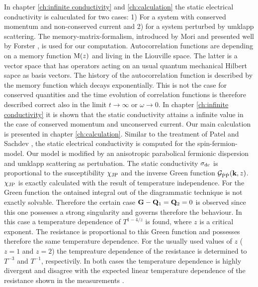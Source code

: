 In chapter \ref{ch:infinite conductivity} and \ref{ch:calculation} the static electrical conductivity is caluculated for two cases:
1) For a system with conserved momentum and non-conserved current and
2) for a system perturbed by umklapp scattering.
The memory-matrix-formalism, introduced by Mori \cite{Mori} and presented well by Forster \cite{Forster}, is used for our computation.
Autocorrelation functions are depending on a memory function $\mathrm{M}(z)$ and living in the Liouville space.
The latter is a vector space that has operators acting on an usual quantum mechanical Hilbert sapce as basis vectors.
The history of the autocorrelation function is described by the memory function which decays exponentially.
This is not the case for conserved quantities and the time evolution of correlation functions is therefore described correct also in the limit $t\to\infty$ or $\omega\to0$.
In chapter \ref{ch:infinite conductivity} it is shown that the static conductivity attains a infinite value in the case of conserved momentum and unconserved current.
Our main calculation is presented in chapter \ref{ch:calculation}.
Similar to the treatment of Patel and Sachdev \cite{Patel&Sachdev}, the static electrical conductivity is computed for the spin-fermion-model.
Our model is modified by an anisotropic parabolical fermionic dispersion and umklapp scattering as pertubation.
The static conductivity $\sigma_{\mathrm{dc}}$ is proportional to the susceptibility $\chi_{\mathrm{JP}}$ and the inverse Green function $\mathcal{G}_{\dot{\mathrm{P}}\dot{\mathrm{P}}}(\vb{k},z)$.
$\chi_{\mathrm{JP}}$ is exactly calculated with the result of temperature independence.
For the Green function the ontained integral out of the diagrammatic technique is not exactly solvable.
Therefore the certain case $\vb{G}-\vb{Q}_{1} = \vb{Q}_{2} = 0$ is observed since this one possesses a strong singularity and governs therefore the behaviour.
In this case a temperature dependence of $T^{1-4/z}$ is found, where $z$ is a critical exponent.
The resistance is proportional to this Green function and possesses therefore the same temperature dependence.
For the usually used values of $z$ ($z=1$ and $z=2$) the tempreature dependence of the resistance is determined to $T^{-3}$ and $T^{-1}$, respectivily.
In both cases the temperature dependence is highly divergent and disagree with the expected linear temperature dependence of the resistance shown in the measurements \cite{Loehneysen}.

